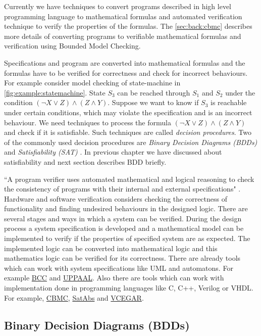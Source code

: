 Currently we have techniques to convert programs described in high level programming language to mathematical formulas and automated verification technique to verify the properties of the formulas. The \autoref{sec:back:cbmc} describes more details of converting programs to verifiable mathematical formulas and verification using Bounded Model Checking.

Specifications and program are converted into mathematical formulas and the formulas have to be verified for correctness and check for incorrect behaviours. For example consider model checking of state-machine in \autoref{fig:example:statemachine}. State $S_3$ can be reached through $S_1$ and $S_2$ under the condition $(\neg X \vee Z) \wedge (Z \wedge Y)$. Suppose we want to know if $S_3$ is reachable under certain conditions, which may violate the specification and is an incorrect behaviour. We need techniques to process the formula $(\neg X \vee Z) \wedge (Z \wedge Y)$ and check if it is satisfiable. Such techniques are called \emph{decision procedures}. Two of the commonly used decision procedures are \emph{Binary Decision Diagrams (BDDs)} and \emph{Satisfiability (SAT)} \cite{kroening2008decision}. In previous chapter we have discussed about satisfiability and next section describes BDD briefly.

``A program verifier uses automated mathematical and logical reasoning to check the consistency of programs with their internal and external specifications" \cite{Hoare03theverifying}. Hardware and software verification considers checking the correctness of functionality and finding undesired behaviours in the designed logic. There are several stages and ways in which a system can be verified. During the design process a system specification is developed and a mathematical model can be implemented to verify if the properties of specified system are as expected. The implemented logic can be converted into mathematical logic and this mathematics logic can be verified for its correctness. There are already tools which can work with system specifications like UML and automatons. For example \href{http://move.lip6.fr/software/BCC/index.html}{BCC} and \href{http://www.uppaal.com/}{UPPAAL}. Also there are tools which can work with implementation done in programming languages like C, C++, Verilog or VHDL. For example, \href{http://www.cprover.org/cbmc/}{CBMC}, \href{http://www.cprover.org/satabs/}{SatAbs} and \href{http://www.cs.cmu.edu/~modelcheck/vcegar/}{VCEGAR}. 
\subsection{Binary Decision Diagrams (BDDs)}

